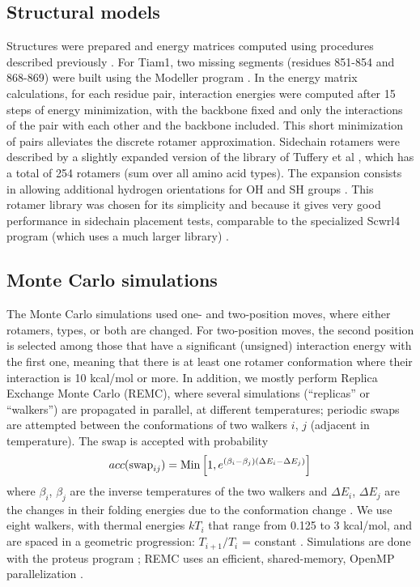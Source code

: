 \documentclass[12pt]{article}
\begin{document}
\subsection{Structural models}
Structures were prepared and energy matrices computed using procedures described previously \cite{Schmidt09,Schmidt10}.
For Tiam1, two missing segments (residues 851-854 and 868-869) were built using the Modeller program \cite{Eswar06}.
In the energy matrix calculations, for each residue pair, interaction energies were computed after 15 steps of energy
minimization, with the backbone fixed and only the interactions of the pair with each other and the backbone included.
This short minimization of pairs alleviates the discrete rotamer approximation. Sidechain rotamers were described by a
slightly expanded version of the library of Tuffery et al \cite{Tuffery91}, which has a total of 254 rotamers (sum over
all amino acid types). The expansion consists in allowing additional hydrogen orientations for OH and SH groups
\cite{Gaillard14}. This rotamer library was chosen for its simplicity and because it gives very good performance in
sidechain placement tests, comparable to the specialized Scwrl4 program (which uses a much larger library) \cite{Krivov09,
Gaillard16}. 

\subsection{Monte Carlo simulations}
The Monte Carlo simulations used one- and two-position moves, where either rotamers, types, or both are changed. For two-position
moves, the second position is selected among those that have a significant (unsigned) interaction energy with the first one,
meaning that there is at least one rotamer conformation where their interaction is 10 kcal/mol or more. In addition, we mostly
perform Replica Exchange Monte Carlo (REMC), where several simulations (``replicas'' or ``walkers'') are propagated in parallel,
at different temperatures; periodic swaps are attempted between the conformations of two walkers $i$, $j$ (adjacent in temperature).
The swap is accepted with probability
\begin{equation} \label{eq:remc}
acc({\rm swap}_{ij}) = {\rm Min} \left[ 1, e^{(\beta_i - \beta_j)(\Delta E_i - \Delta E_j)} \right]
\end{equation}
where $\beta_i$, $\beta_j$ are the inverse temperatures of the two walkers and $\Delta E_i$, $\Delta E_j$ are the changes in
their folding energies due to the conformation change \cite{Kofke02,Earl05}. We use eight walkers, with thermal energies $kT_i$
that range from 0.125 to 3 kcal/mol, and are spaced in a geometric progression: $T_{i+1}/T_i$ = constant \cite{Kofke02}.
Simulations are done with the proteus program \cite{Simonson13b}; REMC uses an efficient, shared-memory, OpenMP parallelization
\cite{Mignon16}.
\end{document}
